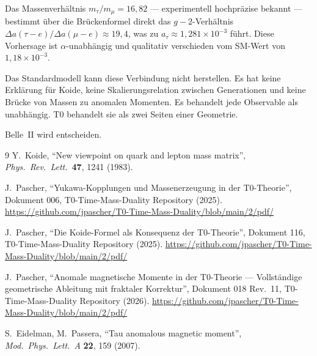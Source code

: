 Das Massenverhältnis $m_\tau/m_\mu = 16{,}82$ — experimentell hochpräzise bekannt — bestimmt über die Brückenformel direkt das $g-2$-Verhältnis $\Delta a(\tau{-}e)/\Delta a(\mu{-}e) \approx 19{,}4$, was zu $a_\tau \approx 1{,}281 \times 10^{-3}$ führt. Diese Vorhersage ist $\alpha$-unabhängig und qualitativ verschieden vom SM-Wert von $1{,}18 \times 10^{-3}$.

Das Standardmodell kann diese Verbindung nicht herstellen. Es hat keine Erklärung für Koide, keine Skalierungsrelation zwischen Generationen und keine Brücke von Massen zu anomalen Momenten. Es behandelt jede Observable als unabhängig. T0 behandelt sie als zwei Seiten einer Geometrie.

Belle~II wird entscheiden.

\begin{thebibliography}{9}
	 Y.~Koide, ``New viewpoint on quark and lepton mass matrix'', 
	\textit{Phys.\ Rev.\ Lett.}\ \textbf{47}, 1241 (1983).
	
	 J.~Pascher, ``Yukawa-Kopplungen und Massenerzeugung in der T0-Theorie'', 
	Dokument 006, T0-Time-Mass-Duality Repository (2025).
	\url{https://github.com/jpascher/T0-Time-Mass-Duality/blob/main/2/pdf/}
	
	 J.~Pascher, ``Die Koide-Formel als Konsequenz der T0-Theorie'', 
	Dokument 116, T0-Time-Mass-Duality Repository (2025).
	\url{https://github.com/jpascher/T0-Time-Mass-Duality/blob/main/2/pdf/}
	
	 J.~Pascher, ``Anomale magnetische Momente in der T0-Theorie — Vollständige geometrische Ableitung mit fraktaler Korrektur'', 
	Dokument 018 Rev.~11, T0-Time-Mass-Duality Repository (2026).
	\url{https://github.com/jpascher/T0-Time-Mass-Duality/blob/main/2/pdf/}
	
	 S.~Eidelman, M.~Passera, ``Tau anomalous magnetic moment'', 
	\textit{Mod.\ Phys.\ Lett.\ A} \textbf{22}, 159 (2007).
\end{thebibliography}
